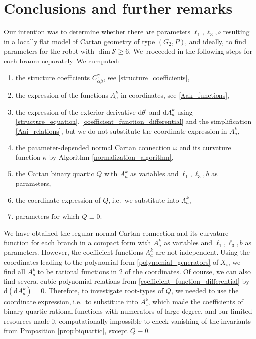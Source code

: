 \documentclass{amsart}
\theoremstyle{plain}
\theoremstyle{definition}
\theoremstyle{remark}
\newcommand{\mc}[1]{\mathcal{#1}}
\newcommand{\di}{\mathrm{d}}
\begin{document}
\section{Conclusions and further remarks} \label{section:results}

Our intention was to determine whether there are parameters $\ell_1,\ell_3,b$ resulting in a locally flat model of Cartan geometry of type $(G_2,P)$, and ideally, to find parameters for the robot with $\dim \mc{S} \geq 6$. We proceeded in the following steps for each branch separately. We computed:
\begin{enumerate}[label=\arabic*)]
    \item the structure coefficients $C_{\alpha\beta}^\gamma$, see \eqref{structure_coefficients},
    \item the expression of the functions $A_a^k$ in coordinates, see \eqref{Aak_functions},
    \item the expression of the exterior derivative $\di \theta^i$ and $\di A_a^k$ using \eqref{structure_equation}, \eqref{coefficient_function_differential} and the simplification \eqref{Aai_relations}, but we do not substitute the coordinate expression in $A_a^k$,
    \item the parameter-depended normal Cartan connection $\omega$ and its curvature function $\kappa$ by Algorithm \ref{normalization_algorithm},
    \item the Cartan binary quartic $Q$ with $A_a^k$ as variables and $\ell_1, \ell_3, b$ as parameters,
    \item the coordinate expression of $Q$, i.e.~we substitute into $A_a^k$,
    \item parameters for which $Q \equiv 0$.
\end{enumerate}

We have obtained the regular normal Cartan connection and its curvature function for each branch in a compact form with $A_a^k$ as variables and $\ell_1, \ell_3, b$ as parameters. However, the coefficient functions $A_a^k$ are not independent. Using the coordinates leading to the polynomial form \eqref{polynomial_generators} of $X_i$, we find all $A_a^k$ to be rational functions in $2$ of the coordinates. Of course, we can also find several cubic polynomial relations from \eqref{coefficient_function_differential} by $\di (\di A_a^k) = 0$. Therefore, to investigate root-types of $Q$, we needed to use the coordinate expression, i.e.~to substitute into $A_a^k$, which made the coefficients of binary quartic rational functions with numerators of large degree, and our limited resources made it computationally impossible to check vanishing of the invariants from Proposition \ref{prop:biquartic}, except $Q \equiv 0$.
\end{document}

